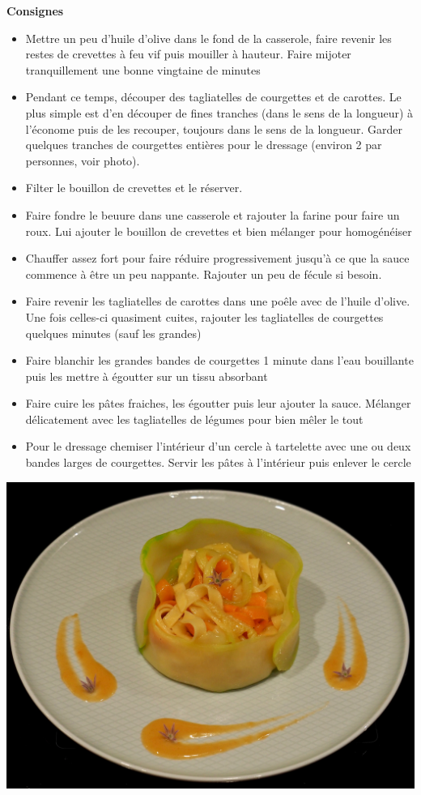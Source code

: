 \documentclass[]{book}
\providecommand{\tightlist}{%
  \setlength{\itemsep}{0pt}\setlength{\parskip}{0pt}}
\begin{document}
\textbf{Consignes}

\begin{itemize}
\tightlist
\item
  Mettre un peu d'huile d'olive dans le fond de la casserole, faire revenir les restes de crevettes à feu vif puis mouiller à hauteur. Faire mijoter tranquillement une bonne vingtaine de minutes
\item
  Pendant ce temps, découper des tagliatelles de courgettes et de carottes. Le plus simple est d'en découper de fines tranches (dans le sens de la longueur) à l'économe puis de les recouper, toujours dans le sens de la longueur. Garder quelques tranches de courgettes entières pour le dressage (environ 2 par personnes, voir photo).
\item
  Filter le bouillon de crevettes et le réserver.
\item
  Faire fondre le beuure dans une casserole et rajouter la farine pour faire un roux. Lui ajouter le bouillon de crevettes et bien mélanger pour homogénéiser
\item
  Chauffer assez fort pour faire réduire progressivement jusqu'à ce que la sauce commence à être un peu nappante. Rajouter un peu de fécule si besoin.
\item
  Faire revenir les tagliatelles de carottes dans une poêle avec de l'huile d'olive. Une fois celles-ci quasiment cuites, rajouter les tagliatelles de courgettes quelques minutes (sauf les grandes)
\item
  Faire blanchir les grandes bandes de courgettes 1 minute dans l'eau bouillante puis les mettre à égoutter sur un tissu absorbant
\item
  Faire cuire les pâtes fraiches, les égoutter puis leur ajouter la sauce. Mélanger délicatement avec les tagliatelles de légumes pour bien mêler le tout
\item
  Pour le dressage chemiser l'intérieur d'un cercle à tartelette avec une ou deux bandes larges de courgettes. Servir les pâtes à l'intérieur puis enlever le cercle
\end{itemize}

\begin{center}\includegraphics[width=0.9\linewidth]{photos/tagliatelles_crevettes} \end{center}
\end{document}
